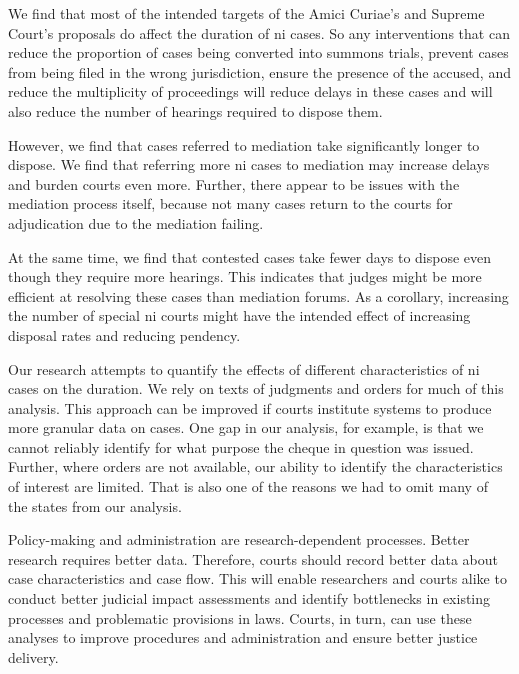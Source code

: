 \documentclass[12pt,a4paper]{article}
\begin{document}
We find that most of the intended targets of the Amici Curiae's and Supreme Court's proposals do affect the duration of \gls{ni} cases. So any interventions that can reduce the proportion of cases being converted into summons trials, prevent cases from being filed in the wrong jurisdiction, ensure the presence of the accused, and reduce the multiplicity of proceedings will reduce delays in these cases and will also reduce the number of hearings required to dispose them.

However, we find that cases referred to mediation take significantly longer to dispose. We find that referring more \gls{ni} cases to mediation may increase delays and burden courts even more. Further, there appear to be issues with the mediation process itself, because not many cases return to the courts for adjudication due to the mediation failing.

At the same time, we find that contested cases take fewer days to dispose even though they require more hearings. This indicates that judges might be more efficient at resolving these cases than mediation forums. As a corollary, increasing the number of special \gls{ni} courts might have the intended effect of increasing disposal rates and reducing pendency.

Our research attempts to quantify the effects of different characteristics of \gls{ni} cases on the duration. We rely on texts of judgments and orders for much of this analysis. This approach can be improved if courts institute systems to produce more granular data on cases. One gap in our analysis, for example, is that we cannot reliably identify for what purpose the cheque in question was issued. Further, where orders are not available, our ability to identify the characteristics of interest are limited. That is also one of the reasons we had to omit many of the states from our analysis.

Policy-making and administration are research-dependent processes. Better research requires better data. Therefore, courts should record better data about case characteristics and case flow. This will enable researchers and courts alike to conduct better judicial impact assessments and identify bottlenecks in existing processes and problematic provisions in laws. Courts, in turn, can use these analyses to improve procedures and administration and ensure better justice delivery.
\end{document}
